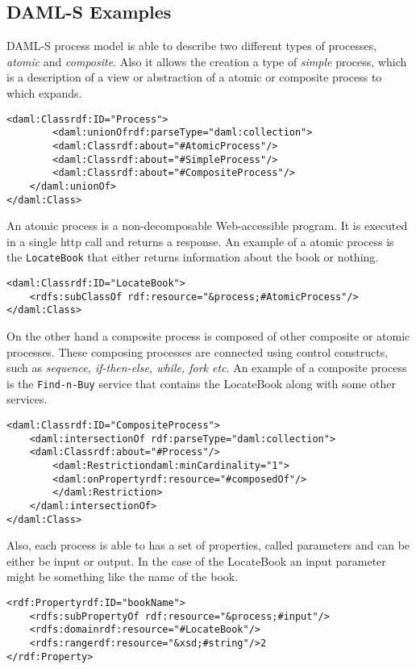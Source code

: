 \subsection*{DAML-S Examples}
DAML-S process model is able to describe two different types of processes, \emph{atomic} and \emph{composite}. Also it allows the creation a type of \emph{simple} process, which is a description of a view or abstraction of a atomic or composite process to which expands.

\begin{lstlisting}
<daml:Classrdf:ID="Process">
        <daml:unionOfrdf:parseType="daml:collection">
        <daml:Classrdf:about="#AtomicProcess"/>
        <daml:Classrdf:about="#SimpleProcess"/>
        <daml:Classrdf:about="#CompositeProcess"/>
    </daml:unionOf>
</daml:Class>
\end{lstlisting}

An atomic process is a non-decomposable Web-accessible program. It is executed in a single http
call and returns a response. An example of a atomic process is the {\tt LocateBook} that either
returns information about the book or nothing.
\begin{lstlisting}
<daml:Classrdf:ID="LocateBook"> 
    <rdfs:subClassOf rdf:resource="&process;#AtomicProcess"/>
</daml:Class>
\end{lstlisting}

On the other hand a composite process is composed of other composite or atomic processes. These
composing processes are connected using control constructs, such as \emph{sequence, if-then-else,
while, fork etc}. An example of a composite process is the {\tt Find-n-Buy} service that contains
the LocateBook along with some other services. 

\begin{lstlisting}
<daml:Classrdf:ID="CompositeProcess">
    <daml:intersectionOf rdf:parseType="daml:collection"> 
	<daml:Classrdf:about="#Process"/> 
	    <daml:Restrictiondaml:minCardinality="1"> 
		<daml:onPropertyrdf:resource="#composedOf"/> 
	    </daml:Restriction>
    </daml:intersectionOf>
</daml:Class>
\end{lstlisting}

Also, each process is able to has a set of properties, called parameters and can be either be input
or output. In the case of the LocateBook an input parameter might be something like the name of the
book.

\begin{lstlisting}
<rdf:Propertyrdf:ID="bookName"> 
    <rdfs:subPropertyOf rdf:resource="&process;#input"/>
    <rdfs:domainrdf:resource="#LocateBook"/>
    <rdfs:rangerdf:resource="&xsd;#string"/>2 
</rdf:Property>
\end{lstlisting}
